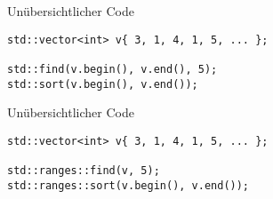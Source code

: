 \begin{frame}[fragile]{Unübersichtlicher Code}
    \begin{verbatim}
std::vector<int> v{ 3, 1, 4, 1, 5, ... };

std::find(v.begin(), v.end(), 5);
std::sort(v.begin(), v.end());
    \end{verbatim}
\end{frame}

\begin{frame}[fragile]{Unübersichtlicher Code}
    \begin{verbatim}
std::vector<int> v{ 3, 1, 4, 1, 5, ... };

std::ranges::find(v, 5);
std::ranges::sort(v.begin(), v.end());
    \end{verbatim}
\end{frame}